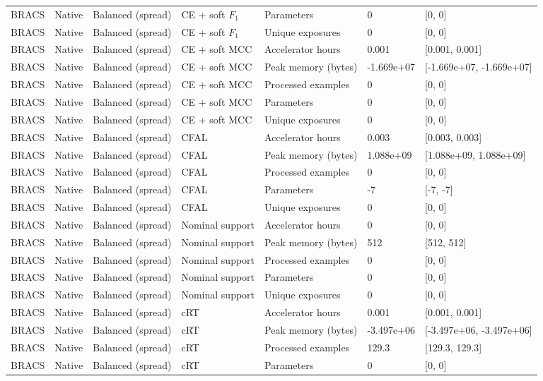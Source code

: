 \begin{longtable}{lllllll}
BRACS & Native & Balanced (spread) & CE + soft $F_1$ & Parameters & 0 & [0, 0] \\
BRACS & Native & Balanced (spread) & CE + soft $F_1$ & Unique exposures & 0 & [0, 0] \\
BRACS & Native & Balanced (spread) & CE + soft MCC & Accelerator hours & 0.001 & [0.001, 0.001] \\
BRACS & Native & Balanced (spread) & CE + soft MCC & Peak memory (bytes) & -1.669e+07 & [-1.669e+07, -1.669e+07] \\
BRACS & Native & Balanced (spread) & CE + soft MCC & Processed examples & 0 & [0, 0] \\
BRACS & Native & Balanced (spread) & CE + soft MCC & Parameters & 0 & [0, 0] \\
BRACS & Native & Balanced (spread) & CE + soft MCC & Unique exposures & 0 & [0, 0] \\
BRACS & Native & Balanced (spread) & CFAL & Accelerator hours & 0.003 & [0.003, 0.003] \\
BRACS & Native & Balanced (spread) & CFAL & Peak memory (bytes) & 1.088e+09 & [1.088e+09, 1.088e+09] \\
BRACS & Native & Balanced (spread) & CFAL & Processed examples & 0 & [0, 0] \\
BRACS & Native & Balanced (spread) & CFAL & Parameters & -7 & [-7, -7] \\
BRACS & Native & Balanced (spread) & CFAL & Unique exposures & 0 & [0, 0] \\
BRACS & Native & Balanced (spread) & Nominal support & Accelerator hours & 0 & [0, 0] \\
BRACS & Native & Balanced (spread) & Nominal support & Peak memory (bytes) & 512 & [512, 512] \\
BRACS & Native & Balanced (spread) & Nominal support & Processed examples & 0 & [0, 0] \\
BRACS & Native & Balanced (spread) & Nominal support & Parameters & 0 & [0, 0] \\
BRACS & Native & Balanced (spread) & Nominal support & Unique exposures & 0 & [0, 0] \\
BRACS & Native & Balanced (spread) & cRT & Accelerator hours & 0.001 & [0.001, 0.001] \\
BRACS & Native & Balanced (spread) & cRT & Peak memory (bytes) & -3.497e+06 & [-3.497e+06, -3.497e+06] \\
BRACS & Native & Balanced (spread) & cRT & Processed examples & 129.3 & [129.3, 129.3] \\
BRACS & Native & Balanced (spread) & cRT & Parameters & 0 & [0, 0] \\

\end{longtable}
